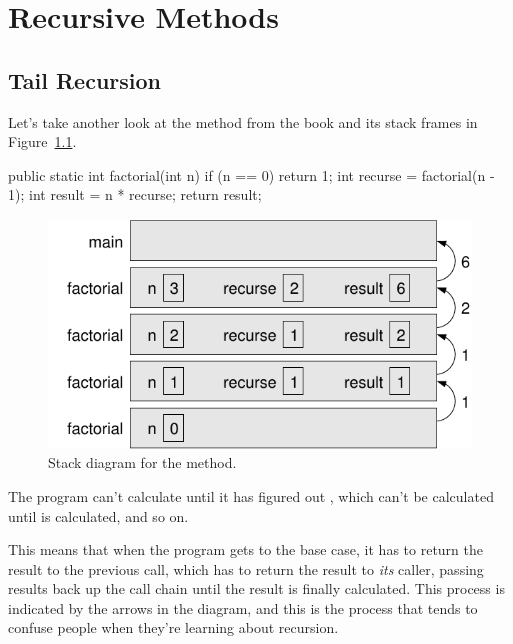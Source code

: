 \chapter{Recursive Methods}

\section{Tail Recursion}

Let's take another look at the  method from the book and its stack frames in Figure~\ref{fig.factorial_stack}.

\begin{code}
public static int factorial(int n) {
    if (n == 0) {
        return 1;
    }
    int recurse = factorial(n - 1);
    int result = n * recurse;
    return result;
}
\end{code}

\begin{figure}[!htb]
\begin{center}
\includegraphics{figs/ch08/stack3.pdf}
\caption{Stack diagram for the  method.}
\label{fig.factorial_stack}
\end{center}
\end{figure}


The program can't calculate  until it has figured out , which can't be calculated until  is calculated, and so on.

This means that when the program gets to the base case, it has to return the result to the previous call, which has to return the result to {\em its} caller, passing results back up the call chain until the result is finally calculated. This process is indicated by the arrows in the diagram, and this is the process that tends to confuse people when they're learning about recursion.

